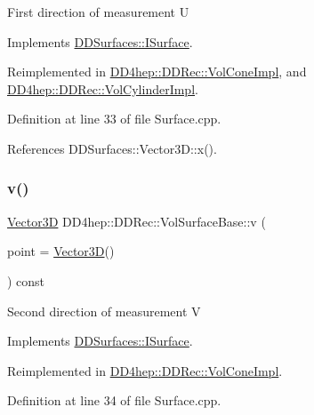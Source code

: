 First direction of measurement U 

Implements \hyperlink{class_d_d_surfaces_1_1_i_surface_a09fd4aa43cc96d50b4b81b94107f7d8f}{D\+D\+Surfaces\+::\+I\+Surface}.



Reimplemented in \hyperlink{class_d_d4hep_1_1_d_d_rec_1_1_vol_cone_impl_a6e9da4a465f95d8579fb579a7ef1236c}{D\+D4hep\+::\+D\+D\+Rec\+::\+Vol\+Cone\+Impl}, and \hyperlink{class_d_d4hep_1_1_d_d_rec_1_1_vol_cylinder_impl_a6dd06a67301fc423f1785c814f73d906}{D\+D4hep\+::\+D\+D\+Rec\+::\+Vol\+Cylinder\+Impl}.



Definition at line 33 of file Surface.\+cpp.



References D\+D\+Surfaces\+::\+Vector3\+D\+::x().

\hypertarget{class_d_d4hep_1_1_d_d_rec_1_1_vol_surface_base_a94d4f190a803d08a9739fb31a8c6fd2f}{}\label{class_d_d4hep_1_1_d_d_rec_1_1_vol_surface_base_a94d4f190a803d08a9739fb31a8c6fd2f} 
\subsubsection{\texorpdfstring{v()}{v()}}
{\footnotesize\ttfamily \hyperlink{class_d_d_surfaces_1_1_vector3_d}{Vector3D} D\+D4hep\+::\+D\+D\+Rec\+::\+Vol\+Surface\+Base\+::v (\begin{DoxyParamCaption}\item[{const \hyperlink{class_d_d_surfaces_1_1_vector3_d}{Vector3D} \&}]{point = {\ttfamily \hyperlink{class_d_d_surfaces_1_1_vector3_d}{Vector3D}()} }\end{DoxyParamCaption}) const\hspace{0.3cm}{\ttfamily [virtual]}}

Second direction of measurement V 

Implements \hyperlink{class_d_d_surfaces_1_1_i_surface_a61c9f2057ea0383b39ead13a147b2838}{D\+D\+Surfaces\+::\+I\+Surface}.



Reimplemented in \hyperlink{class_d_d4hep_1_1_d_d_rec_1_1_vol_cone_impl_a87e96fba8185dccf1422d60a748f5d2f}{D\+D4hep\+::\+D\+D\+Rec\+::\+Vol\+Cone\+Impl}.



Definition at line 34 of file Surface.\+cpp.



